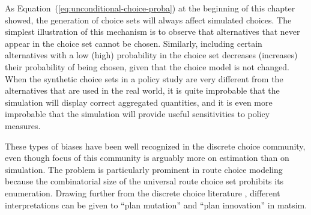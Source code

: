 % 
%

As Equation~(\ref{eq:unconditional-choice-proba}) at the beginning of this chapter showed, the generation of choice sets will always affect simulated choices.
%
The simplest illustration of this mechanism is to observe that alternatives that never appear in the choice set cannot be chosen. Similarly, including certain alternatives with a low (high) probability in the choice set decreases (increases) their probability of being chosen, given that the choice model is not changed. When the synthetic choice sets in a policy study are very different from the alternatives that are used in the real world, it is quite improbable that the simulation will display correct aggregated quantities, and it is even more improbable that the simulation will provide useful sensitivities to policy measures.

These types of biases have been well recognized in the discrete choice community,
even though focus of this community is arguably more on estimation than on
simulation.
The problem is particularly prominent in route choice modeling because the combinatorial
size of the universal route choice set prohibits its enumeration.
Drawing further from the discrete choice literature \citep[specifically][]{frejinger-2010}, 
different interpretations can be given to ``plan mutation'' and ``plan
innovation'' in \gls{matsim}. 
%
%

